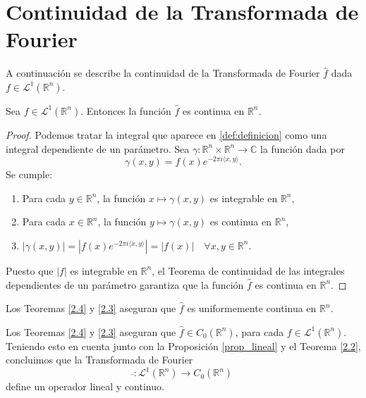 \section{Continuidad de la Transformada de Fourier}
A continuación se describe la continuidad de la Transformada de Fourier $\widehat{f}$ dada $f \in  \mathscr{L}^1(\mathbb{R}^n)$.

\begin{teorema}\label{2.4}
Sea $f \in  \mathscr{L}^1(\mathbb{R}^n)$. Entonces la función $\widehat{f}$ es continua en $\mathbb{R}^n$.  
\end{teorema}


\begin{proof}
Podemos tratar la integral que aparece en \ref{def:definicion} como una integral dependiente de un parámetro.
\noindent Sea $\gamma : \mathbb{R}^n \times \mathbb{R}^n \rightarrow \mathbb{C}$ la función dada por
\begin{equation}
    \gamma(x,y) = 
     f(x) e^{-2\pi i \langle x, y \rangle} .
\end{equation}
Se cumple:
\begin{enumerate}
    \item Para cada $y \in \mathbb{R}^n$, la función $x \mapsto \gamma(x,y)$  es integrable en $\mathbb{R}^n$,
    \item Para cada $x \in \mathbb{R}^n$, la función $y \mapsto \gamma(x,y)$  es continua en $\mathbb{R}^n$,
    \item $|\gamma(x,y)| = |f(x) e^{-2\pi i \langle x, y \rangle}| = |f(x)| \quad \forall x,y \in \mathbb{R}^{n}$.
\end{enumerate}
Puesto que $|f|$ es integrable en $\mathbb{R}^n$, el Teorema de continuidad de las integrales dependientes de un parámetro garantiza que la función $\widehat{f}$ es continua en $\mathbb{R}^n$.
\end{proof}


\begin{observacion}
\noindent Los Teoremas \ref{2.4} y \ref{2.3} aseguran que  $\widehat{f}$ es uniformemente continua en $\mathbb{R}^n$. 
\end{observacion}


\begin{observacion}
    Los Teoremas \ref{2.4} y \ref{2.3} aseguran que  $\widehat{f} \in C_0 (\mathbb{R}^n)$, para cada $f \in \mathscr{L}^1( \mathbb{R}^n)$. Teniendo esto en cuenta junto con la Proposición \ref{prop_lineal} y el  Teorema \ref{2.2}, concluimos que la Transformada de Fourier
    \begin{equation}
        \widehat{} :  \mathscr{L}^1(\mathbb{R}^n) \rightarrow C_0(\mathbb{R}^n)
    \end{equation}
    define un operador lineal y continuo.
\end{observacion}








